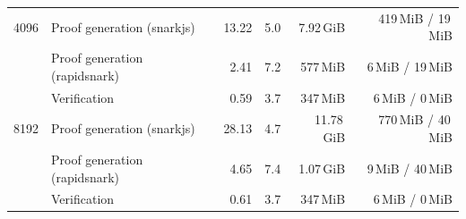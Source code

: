 \begin{table}[t]
{\begin{tabular}{|r|l|r|r|r|r|}
\hline
4096 & Proof generation (snarkjs) & 13.22 & 5.0 & 7.92\,GiB & 419\,MiB / 19\,MiB \\
 & Proof generation (rapidsnark) & 2.41 & 7.2 & 577\,MiB & 6\,MiB / 19\,MiB \\
 & Verification & 0.59 & 3.7 & 347\,MiB & 6\,MiB / 0\,MiB \\
\hline
8192 & Proof generation (snarkjs) & 28.13 & 4.7 & 11.78\,GiB & 770\,MiB / 40\,MiB \\
 & Proof generation (rapidsnark) & 4.65 & 7.4 & 1.07\,GiB & 9\,MiB / 40\,MiB \\
 & Verification & 0.61 & 3.7 & 347\,MiB & 6\,MiB / 0\,MiB \\
\hline
\end{tabular}}
\end{table}
